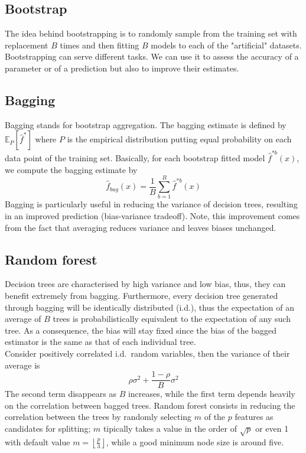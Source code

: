 \subsection{Bootstrap}
The idea behind bootstrapping is to randomly sample from the training set with replacement $B$ times and then fitting $B$ models to each of the "artificial" datasets. Bootstrapping can serve different tasks. We can use it to assess the accuracy of a parameter %
or of a prediction but also to improve their estimates.

\subsection{Bagging}
Bagging stands for bootstrap aggregation. 
The bagging estimate is defined by $\mathbb{E}_P[\hat{f}^*]$ where $P$ is the empirical distribution putting equal probability on each data point of the training set.
Basically, for each bootstrap fitted model $\hat{f}^{*b}(x)$, we compute the bagging estimate by
\begin{equation}
    \hat{f}_{bag}(x)=\frac{1}{B}\sum\limits_{b=1}^{B}\hat{f}^{*b}(x)
\end{equation}
Bagging is particularly useful in reducing the variance of decision trees, resulting in an improved prediction (bias-variance tradeoff).
Note, this improvement comes from the fact that averaging reduces variance and leaves biases unchanged.

\subsection{Random forest}
Decision trees are characterised by high variance and low bias, thus, they can benefit extremely from bagging. Furthermore, every decision tree generated through bagging will be identically distributed (i.d.), thus the expectation of an average of $B$ trees is probabilistically equivalent to the expectation of any such tree. As a consequence, the bias will stay fixed since the bias of the bagged estimator is the same as that of each individual tree. 
\\
Consider positively correlated i.d.\ random variables, then the variance of their average is 
\begin{equation}
    \rho \sigma^2+\frac{1-\rho}{B}\sigma^2
\end{equation}
The second term disappears as $B$ increases, while the first term depends heavily on the correlation between bagged trees. Random forest consists in reducing the correlation between the trees by randomly selecting $m$ of the $p$ features as candidates for splitting; $m$ tipically takes a value in the order of $\sqrt{p}$ or even 1 with default value $m=\left\lfloor \frac{p}{3} \right\rfloor$, while a good minimum node size is around five. 


